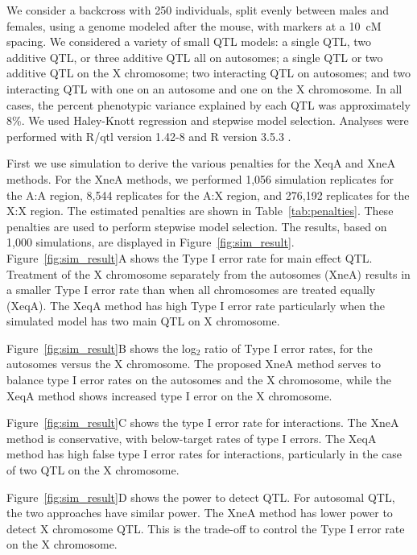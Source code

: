 \documentclass[12pt,letterpaper]{article}
\begin{document}
We consider a backcross with 250 individuals, split evenly between males and females, using a genome modeled
after the mouse, with markers at a 10~cM spacing. We considered a
variety of small QTL models: a single QTL, two additive QTL, or three
additive QTL all on autosomes; a single QTL or two additive QTL on the
X chromosome; two interacting QTL on autosomes; and two interacting
QTL with one on an autosome and one on the X chromosome. In all cases,
the percent phenotypic variance explained by each QTL was
approximately 8\%. We used Haley-Knott regression \citep{Haley1992}
and stepwise model selection. Analyses were performed with R/qtl
version 1.42-8 \citep{Broman2003} and R version 3.5.3 \citep{R}.

First we use simulation to derive the various penalties for the XeqA
and XneA methods. For the XneA methods, we performed 1,056 simulation replicates for the A:A region, 8,544 replicates for the A:X region, and 276,192 replicates for the X:X region. The estimated penalties are shown in Table~\ref{tab:penalties}.
These penalties are used to perform stepwise model selection.
The results, based on 1,000 simulations, are displayed in
Figure~\ref{fig:sim_result}.
Figure~\ref{fig:sim_result}A shows the Type I error rate for main
effect QTL. Treatment of the X chromosome separately from the
autosomes (XneA) results in a smaller Type I error rate than when all
chromosomes are treated equally (XeqA).
The XeqA method has high Type I error rate particularly when  the
simulated model has two main QTL on X chromosome.

Figure~\ref{fig:sim_result}B shows the log$_2$ ratio of Type I error
rates, for the autosomes versus the X chromosome. The proposed XneA
method serves to balance type I error rates on the autosomes and the X
chromosome, while the XeqA method shows increased type I error on the X
chromosome.

Figure~\ref{fig:sim_result}C shows the type I error rate for
interactions. The XneA method is conservative, with below-target rates of
type I errors. The XeqA method has high false type I error rates for interactions,
particularly in the case of two QTL on the X chromosome.

Figure~\ref{fig:sim_result}D shows the power to detect QTL. For
autosomal QTL, the two approaches have similar power. The XneA method
has lower power to detect X chromosome QTL. This is the trade-off to
control the Type I error rate on the X chromosome.
\end{document}
